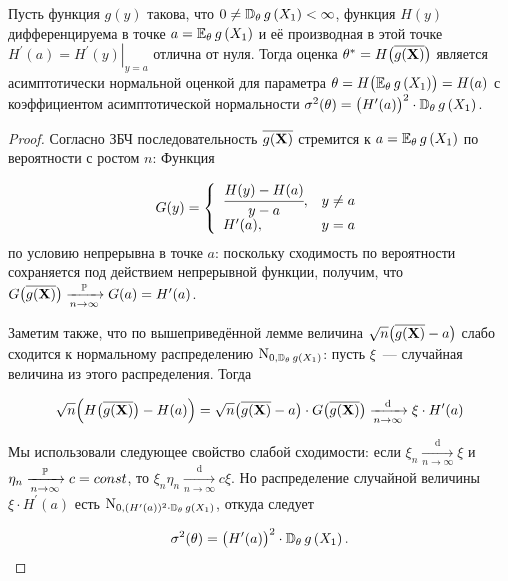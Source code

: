 \begin{thm*}
    Пусть функция $g(y)$ такова, что $0 \neq \operatorname{\mathbb{D}_{\theta}} g\left(X_{1}\right)<\infty$, функция $H(y)$ дифференцируема в точке $a=\operatorname{\operatorname{\mathbb{E}}_{\theta}} g\left(X_{1}\right)$ и её производная в этой точке $H^{\prime}(a)=\left.H^{\prime}(y)\right|_{y=a}$ отлична от нуля. 
    Тогда оценка $\theta^{*}=H\bigl(\overline{g(\mathbf{X})}\bigr)$ является асимптотически нормальной оценкой для параметра $\theta = H\bigl(\operatorname{\operatorname{\mathbb{E}}_{\theta}} g\left(X_{1}\right)\bigr) = H(a)$ с коэффициентом асимптотической нормальности $\sigma^{2}(\theta)=\bigl(H^{\prime}(a)\bigr)^{2} \cdot \operatorname{\mathbb{D}_{\theta}} g\left(X_{1}\right)$.
\end{thm*}

\begin{proof}
    Согласно ЗБЧ последовательность $\overline{g(\mathbf{X})}$ стремится к $a=\operatorname{\operatorname{\mathbb{E}}_{\theta}} g\left(X_{1}\right)$ по вероятности с ростом $n$: Функция

    \begin{equation*}
        G(y)=\left\{\begin{array}{ll}
        \cfrac{H(y)-H(a)}{y-a}, & y \neq a \\
        H^{\prime}(a), & y=a
        \end{array}\right.  
    \end{equation*}
    по условию непрерывна в точке $a$: 
    поскольку сходимость по вероятности сохраняется под действием непрерывной функции, получим,
    что $G\bigl(\overline{g(\mathbf{X})}\bigr) \xrightarrow[n \to \infty]{\operatorname{\mathbb{P}}} G(a)=H^{\prime}(a)$.

    Заметим также, что по вышеприведённой лемме величина ${\sqrt{n}\bigl(\overline{g(\mathbf{X})} - a\bigr)}$ слабо сходится
    к нормальному распределению $\operatorname{\mathrm{N}}_{0, \operatorname{\mathbb{D}_{\theta}} g(X_{1})}$: 
    пусть $\xi$~--- случайная величина из этого распределения. Тогда

    \begin{equation*}
        \sqrt{n} \Bigl(H\bigl(\overline{g(\mathbf{X})}\bigr) - H(a)\Bigr) = 
        \sqrt{n} \bigl(\overline{g(\mathbf{X})} - a\bigr) \cdot G\bigl(\overline{g(\mathbf{X})}\bigr) 
        \xrightarrow[n \to \infty]{\text{d}} \xi \cdot H^{\prime}(a)
    \end{equation*}

    Мы использовали следующее свойство слабой сходимости: если $\xi_{n} \xrightarrow[n \to \infty]{\text{d}} \xi$ и $\eta_{n} \xrightarrow[n \to \infty]{\operatorname{\mathbb{P}}} c=const$, то $\xi_{n} \eta_{n} \xrightarrow[n \to \infty]{\text{d}} c \xi$.
    Но распределение случайной величины $\xi \cdot H^{\prime}(a)$ есть $\operatorname{\mathrm{N}}_{0,(H^{\prime}(a))^{2} \cdot \operatorname{\mathbb{D}_{\theta}} g(X_{1})}$, откуда следует

    \begin{equation*}
        \sigma^{2}(\theta)=\bigl(H^{\prime}(a)\bigr)^{2} \cdot \operatorname{\mathbb{D}_{\theta}} g\left(X_{1}\right).
    \end{equation*}
\end{proof}
